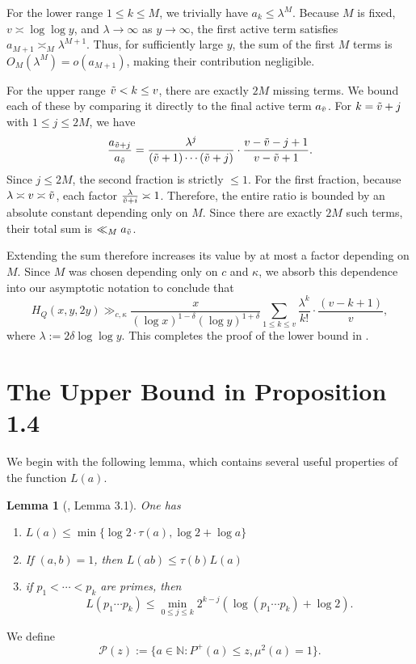 \documentclass{amsart}
\newtheorem{lemma}[theorem]{Lemma}
\theoremstyle{definition}
\numberwithin{equation}{section}
\newcommand{\N}{\mathbb{N}}
\newcommand{\density}{\delta}
\begin{document}
	For the lower range $1 \leq k \leq M$, we trivially have $a_k \leq \lambda^M$. Because $M$ is fixed, $v \asymp \log \log y$, and $\lambda \to \infty$ as $y \to \infty$, the first active term satisfies $a_{M+1} \asymp_M \lambda^{M+1}$. Thus, for sufficiently large $y$, the sum of the first $M$ terms is $O_M(\lambda^M) = o(a_{M+1})$, making their contribution negligible. 
	
	For the upper range $\Tilde{v} < k \leq v$, there are exactly $2M$ missing terms. We bound each of these by comparing it directly to the final active term $a_{\Tilde{v}}$. For $k = \Tilde{v}+j$ with $1 \leq j \leq 2M$, we have
	$$ \frac{a_{\Tilde{v}+j}}{a_{\Tilde{v}}} = \frac{\lambda^j}{(\Tilde{v}+1)\cdots(\Tilde{v}+j)} \cdot \frac{v-\Tilde{v}-j+1}{v-\Tilde{v}+1}. $$
	Since $j \leq 2M$, the second fraction is strictly $\leq 1$. For the first fraction, because $\lambda \asymp v \asymp \Tilde{v}$, each factor $\frac{\lambda}{\Tilde{v}+i} \asymp 1$. Therefore, the entire ratio is bounded by an absolute constant depending only on $M$. Since there are exactly $2M$ such terms, their total sum is $\ll_M a_{\Tilde{v}}$.
	
	Extending the sum therefore increases its value by at most a factor depending on $M$. Since $M$ was chosen depending only on $c$ and $\kappa$, we absorb this dependence into our asymptotic notation to conclude that
	\begin{equation}\label{final LB}
		H_Q(x,y,2y) \gg_{c,\kappa} \frac{x}{(\log x)^{1-\density}(\log y)^{1+\density}}    \sum_{1 \leq k \leq v} \frac{\lambda^k}{k!}\cdot\frac{(v-k+1)}{v},
	\end{equation}
	where $\lambda := 2\density \log \log y$. This completes the proof of the lower bound in .
	
	\section{The Upper Bound in Proposition 1.4}\label{sec upper bounds}
	We begin with the following lemma, which contains several useful properties of the function $L(a)$.
	\begin{lemma}[\cite{ford2008distribution}, Lemma 3.1]\label{lemma L properties}
		One has
		\begin{enumerate}[label = (\roman*)]
			\item $L(a) \leq \min\{\log 2 \cdot \tau(a),\log 2 + \log a\}$
			\item If $(a,b) = 1$, then $L(ab) \leq \tau(b)L(a)$ 
			\item if $p_1<\cdots < p_k$ are primes, then 
			$$L(p_1\cdots p_k) \leq \min_{0 \leq j \leq k}2^{k-j}(\log(p_1\cdots p_k)+\log 2).$$
		\end{enumerate}
	\end{lemma}
	We define $$\mathscr{P}(z):= \big\{a \in \N: P^+(a) \leq z, \mu^2(a) = 1\big\}.$$
	
\end{document}
